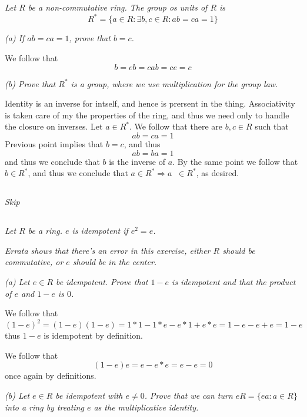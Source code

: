 \documentclass[11pt,oneside,titlepage]{book}
\DeclareMathOperator \inv {^{-1}}
\DeclareMathOperator \ra {\Rightarrow}
\newcommand{\set}[1]{\{ #1 \}}
\begin{document}
\subsection{}

\textit{Let $R$ be a non-commutative ring. The group os units of $R$
is
  $$R^* = \set{a \in R: \exists b, c \in R: ab = ca = 1}$$}

\textit{(a) If $ab = ca = 1$, prove that $b = c$.}

We follow that
$$b = e b = c a b  = c e = c$$

\textit{(b) Prove that $R^*$ is a group, where we use multiplication
for the group law.}

Identity is an inverse for intself, and hence is prersent in the
thing.  Associativity is taken care of my the properties of the ring,
and thus we need only to handle the closure on inverses.  Let $a \in
R^*$. We follow that there are $b, c \in R$ such that
$$ab = ca = 1$$
Previous point implies that $b = c$, and thus
$$ab = ba = 1$$
and thus we conclude that $b$ is the inverse of $a$. By the same point
we follow that $b \in R^*$, and thus we conclude that $a \in R^* \ra
a\inv \in R^*$, as desired.

\subsection{}

\textit{Skip}

\subsection{}

\textit{Let $R$ be a ring. $e$ is idempotent if $e^2 = e$.}

\textit{Errata shows that there's an error in this exercise, either
$R$ should be commutative, or $e$ should be in the center.}

\textit{(a) Let $e \in R$ be idempotent. Prove that $1 - e$ is
idempotent and that the product of $e$ and $1 - e$ is $0$.}

We follow that
$$(1 - e)^2 = (1 - e)(1 - e) = 1 * 1 - 1 * e - e * 1 + e * e =
1 - e - e + e = 1 - e$$ thus $1 - e$ is idempotent by definition.

We follow that
$$(1 - e) e = e - e * e = e - e = 0$$
once again by definitions.

\textit{(b) Let $e \in R$ be idempotent with $e \neq 0$. Prove that we
can turn $eR = \set{ea: a \in R}$ into a ring by treating $e$ as the
multiplicative identity.}
\end{document}
